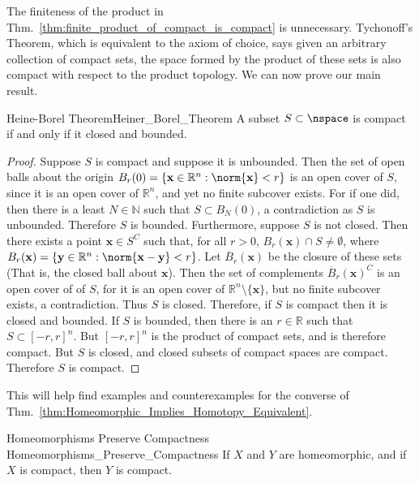 \documentclass{article}                                                        %
\begin{document}
        The finiteness of the product in
        Thm.~\ref{thm:finite_product_of_compact_is_compact} is unnecessary.
        Tychonoff's Theorem, which is equivalent to the axiom of choice, says
        given an arbitrary collection of compact sets, the space formed by the
        product of these sets is also compact with respect to the product
        topology. We can now prove our main result.
        \begin{ftheorem}{Heine-Borel Theorem}{Heiner_Borel_Theorem}
            A subset $S\subset\nspace$ is compact if
            and only if it closed and bounded.
        \end{ftheorem}
        \begin{proof}
            Suppose $S$ is compact and suppose it is unbounded. Then the
            set of open balls about the origin
            $B_{r}(0)=\{\mathbf{x}\in\mathbb{R}^{n}:\norm{\mathbf{x}}<r\}$
            is an open cover of $S$, since it is an open cover of
            $\mathbb{R}^{n}$, and yet no finite subcover exists. For if
            one did, then there is a least $N\in\mathbb{N}$ such that
            $S\subset{B_{N}(0)}$, a contradiction as $S$ is unbounded.
            Therefore $S$ is bounded. Furthermore, suppose $S$ is
            not closed. Then there exists a point $\mathbf{x}\in{S^{C}}$
            such that, for all $r>0$,
            $B_{r}(\mathbf{x})\cap{S}\ne\emptyset$, where
            $B_{r}(\mathbf{x})=\{\mathbf{y}\in\mathbb{R}^{n}:%
             \norm{\mathbf{x}-\mathbf{y}}<r\}$.
            Let $\overline{B}_{r}(\mathbf{x})$ be the closure of these sets
            (That is, the closed ball about $\mathbf{x}$). Then the set of
            complements $\overline{B}_{r}(\mathbf{x})^{C}$ is an open cover
            of of $S$, for it is an open cover of
            $\mathbb{R}^{n}\setminus\{\mathbf{x}\}$, but no finite subcover
            exists, a contradiction. Thus $S$ is closed. Therefore, if $S$
            is compact then it is closed and bounded. If $S$ is bounded,
            then there is an $r\in\mathbb{R}$ such that
            $S\subset[-r,r]^{n}$. But $[-r,r]^{n}$ is the product of compact
            sets, and is therefore compact. But $S$ is closed, and closed
            subsets of compact spaces are compact. Therefore $S$ is compact.
        \end{proof}
        This will help find examples and counterexamples for the converse of
        Thm.~\ref{thm:Homeomorphic_Implies_Homotopy_Equivalent}.
        \begin{ltheorem}{Homeomorphisms Preserve Compactness}
                        {Homeomorphisms_Preserve_Compactness}
            If $X$ and $Y$ are homeomorphic, and if $X$ is compact,
            then $Y$ is compact.
        \end{ltheorem}
\end{document}
